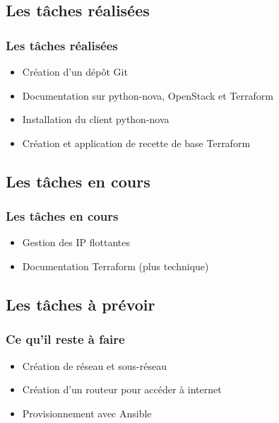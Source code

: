 \documentclass[11pt]{beamer} %
\begin{document}
		
		
		\subsection{Les tâches réalisées}
			\begin{frame}
				\frametitle{Les tâches réalisées}
				\begin{itemize}
					\item Création d'un dépôt Git
					\item Documentation sur python-nova, OpenStack et Terraform
					\item Installation du client python-nova
					\item Création et application de recette de base Terraform
				\end{itemize}
			\end{frame}
		
		
		\subsection{Les tâches en cours}
			\begin{frame}
				\frametitle{Les tâches en cours}
				\begin{itemize}
					\item Gestion des IP flottantes
					\item Documentation Terraform (plus technique)
				\end{itemize}
			\end{frame}
		
			
		
		\subsection{Les tâches à prévoir}
			\begin{frame}
				\frametitle{Ce qu'il reste à faire}
				\begin{itemize}
					\item Création de réseau et sous-réseau
					\item Création d'un routeur pour accéder à internet
					\item Provisionnement avec Ansible
				\end{itemize}
			\end{frame}
\end{document}
